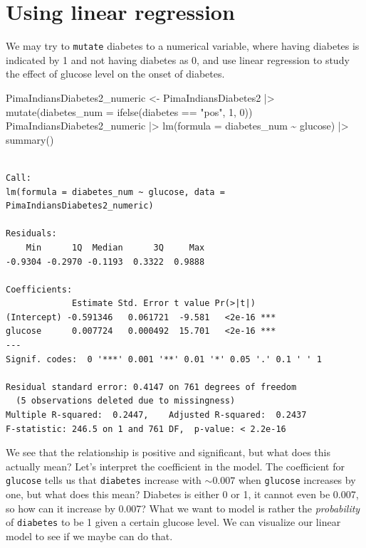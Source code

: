 \documentclass[
  letterpaper,
  DIV=11,
  numbers=noendperiod]{scrreprt}
\newenvironment{Shaded}{\begin{snugshade}}{\end{snugshade}}
\newcommand{\AttributeTok}[1]{\textcolor[rgb]{0.40,0.45,0.13}{#1}}
\newcommand{\DecValTok}[1]{\textcolor[rgb]{0.68,0.00,0.00}{#1}}
\newcommand{\FunctionTok}[1]{\textcolor[rgb]{0.28,0.35,0.67}{#1}}
\newcommand{\NormalTok}[1]{\textcolor[rgb]{0.00,0.23,0.31}{#1}}
\newcommand{\OtherTok}[1]{\textcolor[rgb]{0.00,0.23,0.31}{#1}}
\newcommand{\SpecialCharTok}[1]{\textcolor[rgb]{0.37,0.37,0.37}{#1}}
\newcommand{\StringTok}[1]{\textcolor[rgb]{0.13,0.47,0.30}{#1}}
\begin{document}
\section{Using linear regression}\label{using-linear-regression}

We may try to \texttt{mutate} diabetes to a numerical variable, where
having diabetes is indicated by 1 and not having diabetes as 0, and use
linear regression to study the effect of glucose level on the onset of
diabetes.

\begin{Shaded}
\begin{Highlighting}[]
\NormalTok{PimaIndiansDiabetes2\_numeric }\OtherTok{\textless{}{-}}\NormalTok{ PimaIndiansDiabetes2 }\SpecialCharTok{|\textgreater{}}
  \FunctionTok{mutate}\NormalTok{(}\AttributeTok{diabetes\_num =} \FunctionTok{ifelse}\NormalTok{(diabetes }\SpecialCharTok{==} \StringTok{"pos"}\NormalTok{, }\DecValTok{1}\NormalTok{, }\DecValTok{0}\NormalTok{))}
\NormalTok{PimaIndiansDiabetes2\_numeric }\SpecialCharTok{|\textgreater{}}  
  \FunctionTok{lm}\NormalTok{(}\AttributeTok{formula =}\NormalTok{ diabetes\_num }\SpecialCharTok{\textasciitilde{}}\NormalTok{ glucose) }\SpecialCharTok{|\textgreater{}} 
  \FunctionTok{summary}\NormalTok{()}
\end{Highlighting}
\end{Shaded}

\begin{verbatim}

Call:
lm(formula = diabetes_num ~ glucose, data = PimaIndiansDiabetes2_numeric)

Residuals:
    Min      1Q  Median      3Q     Max 
-0.9304 -0.2970 -0.1193  0.3322  0.9888 

Coefficients:
             Estimate Std. Error t value Pr(>|t|)    
(Intercept) -0.591346   0.061721  -9.581   <2e-16 ***
glucose      0.007724   0.000492  15.701   <2e-16 ***
---
Signif. codes:  0 '***' 0.001 '**' 0.01 '*' 0.05 '.' 0.1 ' ' 1

Residual standard error: 0.4147 on 761 degrees of freedom
  (5 observations deleted due to missingness)
Multiple R-squared:  0.2447,    Adjusted R-squared:  0.2437 
F-statistic: 246.5 on 1 and 761 DF,  p-value: < 2.2e-16
\end{verbatim}

We see that the relationship is positive and significant, but what does
this actually mean? Let's interpret the coefficient in the model. The
coefficient for \texttt{glucose} tells us that \texttt{diabetes}
increase with \(\sim0.007\) when \texttt{glucose} increases by one, but
what does this mean? Diabetes is either 0 or 1, it cannot even be 0.007,
so how can it increase by 0.007? What we want to model is rather the
\emph{probability} of \texttt{diabetes} to be 1 given a certain glucose
level. We can visualize our linear model to see if we maybe can do that.
\end{document}
